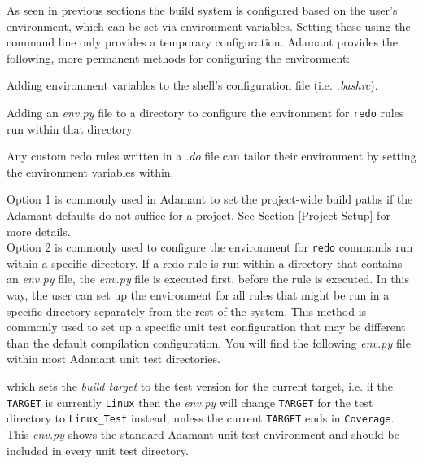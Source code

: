 As seen in previous sections  the build system is configured based on the user's environment, which can be set via environment variables. Setting these using the command line only provides a temporary configuration. Adamant provides the following, more permanent methods for configuring the environment:

\vspace{5mm} %
\begin{spacedenumerate}
  \item Adding environment variables to the shell's configuration file (i.e. \textit{.bashrc}).
  \item Adding an \textit{env.py} file to a directory to configure the environment for \texttt{redo} rules run within that directory.
  \item Any custom redo rules written in a \textit{.do} file can tailor their environment by setting the environment variables within.
\end{spacedenumerate}
\vspace{5mm} %

Option 1 is commonly used in Adamant to set the project-wide build paths if the Adamant defaults do not suffice for a project. See Section \ref{Project Setup} for more details. \\

Option 2 is commonly used to configure the environment for \texttt{redo} commands run within a specific directory. If a redo rule is run within a directory that contains an \textit{env.py} file, the \textit{env.py} file is executed first, before the rule is executed. In this way, the user can set up the environment for all rules that might be run in a specific directory separately from the rest of the system. This method is commonly used to set up a specific unit test configuration that may be different than the default compilation configuration. You will find the following \textit{env.py} file within most Adamant unit test directories.


which sets the \textit{build target} to the test version for the current target, i.e. if the \texttt{TARGET} is currently \texttt{Linux} then the \textit{env.py} will change \texttt{TARGET} for the test directory to \texttt{Linux\_Test} instead, unless the current \texttt{TARGET} ends in \texttt{Coverage}. This \textit{env.py} shows the standard Adamant unit test environment and should be included in every unit test directory. \\

